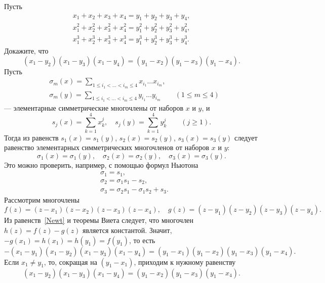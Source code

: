 \problem
Пусть
\begin{gather*}
    x_1 + x_2 + x_3 + x_4 = y_1 + y_2 + y_3 + y_4
,\\
    x_1^2 + x_2^2 + x_3^2 + x_4^2
=
    y_1^2 + y_2^2 + y_3^2 + y_4^2
,\\
    x_1^3 + x_2^3 + x_3^3 + x_4^3
=
    y_1^3 + y_2^3 + y_3^3 + y_4^3
.\end{gather*}
Докажите, что
\[
    (x_1 - y_2) (x_1 - y_3) (x_1 - y_4)
=
    (y_1 - x_2) (y_1 - x_3) (y_1 - x_4)
.\]
\solution
Пусть
\begin{align*}&
    \sigma_m(x)
=
    \sum\limits_{1 \leq i_1 < \ldots < i_m \leq 4}
        x_{i_1} \ldots x_{i_m}
,\\&
    \sigma_m(y)
=
    \sum\limits_{1 \leq i_1 < \ldots < i_m \leq 4}
        y_{i_1} \ldots y_{i_m}
\qquad
    (1 \leq m \leq 4)
\end{align*}
--- элементарные симметрические многочлены от наборов $x$ и $y$, и
\[
    s_j(x)
=
    \sum\limits_{k = 1}^{4}
        x_k^j
,\quad
    s_j(y)
=
    \sum\limits_{k = 1}^{4}
        y_k^j
\qquad
    (j \geq 1)
.\]
Тогда из равенств $s_1(x) = s_1(y)$, $s_2(x) = s_2(y)$, $s_3(x) = s_3(y)$
следует равенство элементарных симметрических многочленов
от наборов $x$ и $y$:
\begin{equation} \label{Newt}
    \sigma_1(x) = \sigma_1(y)
,\quad
    \sigma_2(x) = \sigma_2(y)
,\quad
    \sigma_3(x) = \sigma_3(y)
.\end{equation}
Это можно проверить, например, с помощью формул Ньютона
\begin{align*}&
    \sigma_1 = s_1
,\\&
    \sigma_2 = \sigma_1 s_1 - s_2
,\\&
    \sigma_3 = \sigma_2 s_1 - \sigma_1 s_2 + s_3
.\end{align*}
Рассмотрим многочлены
\[
    f(z) = (z - x_1) (z - x_2) (z - x_3) (z - x_4)
,\quad
    g(z) = (z - y_1) (z - y_2) (z - y_3) (z - y_4)
.\]
Из равенств~\eqref{Newt} и теоремы Виета следует, что многочлен
$h(z) = f(z) - g(z)$ является константой.
Значит, $-g(x_1) = h(x_1) = h(y_1) = f(y_1)$, то есть
\begin{equation} \label{hh}
    - (x_1 - y_1) (x_1-y_2) (x_1 - y_3) (x_1 - y_4)
=
    (y_1 - x_1) (y_1 - x_2) (y_1 - x_3) (y_1 - x_4)
.\end{equation}
Если $x_1 \neq y_1$, то, сокращая на $(y_1 - x_1)$, приходим к нужному
равенству
\begin{equation} \label{Nuzh}
    (x_1 - y_2) (x_1 - y_3) (x_1 - y_4)
=
    (y_1 - x_2) (y_1 - x_3) (y_1 - x_4)
.\end{equation}
